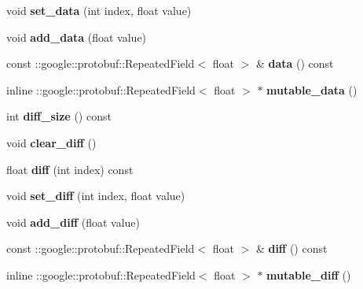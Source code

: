 \begin{DoxyCompactItemize}
void {\bfseries set\+\_\+data} (int index, float value)
\item 
\mbox{\label{classcaffe_1_1_blob_proto_a8a2749e8fe5a28a3b04e73c2aae66d3d}} 
void {\bfseries add\+\_\+data} (float value)
\item 
\mbox{\label{classcaffe_1_1_blob_proto_a8b6cf87254d705bb2da89c27491d578a}} 
const \+::google\+::protobuf\+::\+Repeated\+Field$<$ float $>$ \& {\bfseries data} () const
\item 
\mbox{\label{classcaffe_1_1_blob_proto_a9414936c39ec2480f79ee1cc4260d932}} 
inline \+::google\+::protobuf\+::\+Repeated\+Field$<$ float $>$ $\ast$ {\bfseries mutable\+\_\+data} ()
\item 
\mbox{\label{classcaffe_1_1_blob_proto_a0fd81c901f3ca51801add1249908be49}} 
int {\bfseries diff\+\_\+size} () const
\item 
\mbox{\label{classcaffe_1_1_blob_proto_a1d53c26cead4beb71888c69f83825ca8}} 
void {\bfseries clear\+\_\+diff} ()
\item 
\mbox{\label{classcaffe_1_1_blob_proto_ae0733a38738e6734fe527d4d33d17a2a}} 
float {\bfseries diff} (int index) const
\item 
\mbox{\label{classcaffe_1_1_blob_proto_ad9e8606f04e85d9f0464daa17431f2be}} 
void {\bfseries set\+\_\+diff} (int index, float value)
\item 
\mbox{\label{classcaffe_1_1_blob_proto_ae5cd593999b63420951668547058ebd9}} 
void {\bfseries add\+\_\+diff} (float value)
\item 
\mbox{\label{classcaffe_1_1_blob_proto_a6ba0354400b439592b0cf60ea0a12552}} 
const \+::google\+::protobuf\+::\+Repeated\+Field$<$ float $>$ \& {\bfseries diff} () const
\item 
\mbox{\label{classcaffe_1_1_blob_proto_a6edd7be9b435cbc1875f803b2ee83d31}} 
inline \+::google\+::protobuf\+::\+Repeated\+Field$<$ float $>$ $\ast$ {\bfseries mutable\+\_\+diff} ()

\end{DoxyCompactItemize}
